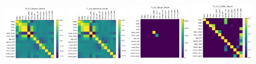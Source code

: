 \begin{figure}
    \centering
    \includegraphics[width=0.24\textwidth]{diss/7_cond/figs/T1_0.0_Pearson_Result.png}
    \includegraphics[width=0.24\textwidth]{diss/7_cond/figs/T1_0.0_Spearman_Result.png}
    \includegraphics[width=0.24\textwidth]{diss/7_cond/figs/T1_0.0_Glasso_Result.png}
    \includegraphics[width=0.24\textwidth]{diss/7_cond/figs/T1_0.0_CODEC_Result.png}
    

\end{figure}
